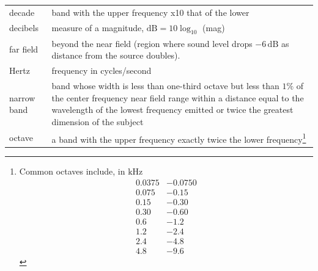 \documentclass[
]{book}
\begin{document}
\begin{longtable}[]{@{}ll@{}}
\toprule
\endhead
\begin{minipage}[t]{0.21\columnwidth}\raggedright
decade\strut
\end{minipage} & \begin{minipage}[t]{0.73\columnwidth}\raggedright
band with the upper frequency x10 that of the lower\strut
\end{minipage}\tabularnewline
\begin{minipage}[t]{0.21\columnwidth}\raggedright
decibels\strut
\end{minipage} & \begin{minipage}[t]{0.73\columnwidth}\raggedright
measure of a magnitude, \(\text{dB} = 10 \log_{10}\) (mag)\strut
\end{minipage}\tabularnewline
\begin{minipage}[t]{0.21\columnwidth}\raggedright
far field\strut
\end{minipage} & \begin{minipage}[t]{0.73\columnwidth}\raggedright
beyond the near field (region where sound level drops \(-6\,\text{dB}\) as distance from the source doubles).\strut
\end{minipage}\tabularnewline
\begin{minipage}[t]{0.21\columnwidth}\raggedright
Hertz\strut
\end{minipage} & \begin{minipage}[t]{0.73\columnwidth}\raggedright
frequency in cycles/second\strut
\end{minipage}\tabularnewline
\begin{minipage}[t]{0.21\columnwidth}\raggedright
narrow band\strut
\end{minipage} & \begin{minipage}[t]{0.73\columnwidth}\raggedright
band whose width is less than one-third octave but less than \(1\%\) of the center frequency near field range within a distance equal to the wavelength of the lowest frequency emitted or twice the greatest dimension of the subject\strut
\end{minipage}\tabularnewline
\begin{minipage}[t]{0.21\columnwidth}\raggedright
octave\strut
\end{minipage} & \begin{minipage}[t]{0.73\columnwidth}\raggedright
a band with the upper frequency exactly twice the lower frequency\footnote{Common octaves include, in \(\text{kHz}\) \begin{align} 0.0375&-0.0750\\0.075&-0.15\\0.15&-0.30\\0.30&-0.60\\0.6&-1.2\\1.2&-2.4\\2.4&-4.8\\4.8&-9.6\end{align}}\strut

\end{minipage}
\end{longtable}
\end{document}

